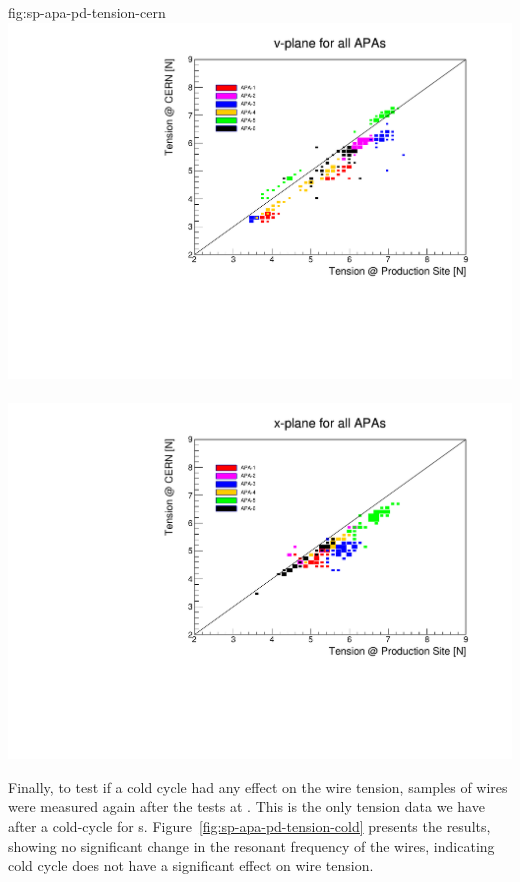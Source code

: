 \begin{dunefigure}{fig:sp-apa-pd-tension-cern}
\mbox{\includegraphics[height=0.23\textheight]{graphics/sp-apa-PD-tension-prod-cern-V.pdf} %
\includegraphics[height=0.23\textheight]{graphics/sp-apa-PD-tension-prod-cern-X.pdf}}
\end{dunefigure}

Finally, to test if a cold cycle had any effect on the wire tension, samples of wires were measured again after the \coldbox tests at . This is the only tension data we have after a cold-cycle for  s. Figure~\ref{fig:sp-apa-pd-tension-cold} presents the results, showing no significant change in the resonant frequency of the wires, indicating cold cycle does not have a significant effect on wire tension.


